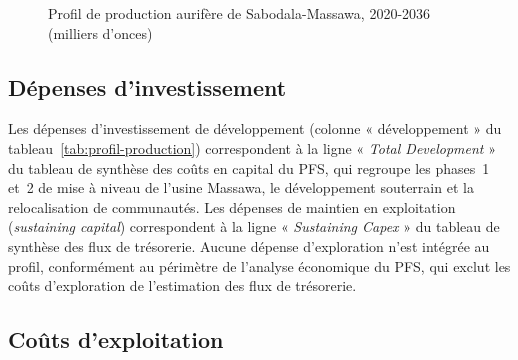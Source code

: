 \begin{figure}[H]
\centering
{}
\caption{Profil de production aurifère de Sabodala-Massawa, 2020-2036 (milliers d'onces)}
\label{fig:production}
\end{figure}

\subsection{Dépenses d'investissement}

Les dépenses d'investissement de développement (colonne « \CAPEX{} développement » du tableau~\ref{tab:profil-production}) correspondent à la ligne « \emph{Total Development} » du tableau de synthèse des coûts en capital du PFS, qui regroupe les phases~1 et~2 de mise à niveau de l'usine Massawa, le développement souterrain et la relocalisation de communautés. Les dépenses de maintien en exploitation (\emph{sustaining capital}) correspondent à la ligne « \emph{Sustaining Capex} » du tableau de synthèse des flux de trésorerie. Aucune dépense d'exploration n'est intégrée au profil, conformément au périmètre de l'analyse économique du PFS, qui exclut les coûts d'exploration de l'estimation des flux de trésorerie.

\subsection{Coûts d'exploitation}

